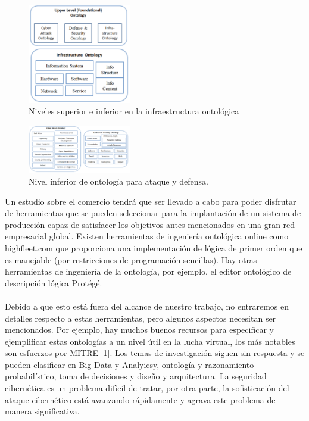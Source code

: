 \documentclass[journal]{IEEEtran}
\begin{document}
\begin{figure}[htb]
\centering
\includegraphics[width=0.4\textwidth]{img3.png}
\caption{Niveles superior e inferior en la infraestructura ontológica}%
\end{figure}

\begin{figure}[htb]
\centering
\includegraphics[width=0.4\textwidth]{img4.png}
\caption{Nivel inferior de ontología para ataque y defensa.}%
\end{figure}

Un estudio sobre el comercio tendrá que ser llevado a cabo para poder disfrutar de herramientas que se pueden seleccionar para la implantación de un sistema de producción capaz de satisfacer los objetivos antes mencionados en una gran red empresarial global. Existen herramientas de ingeniería ontológica online como highfleet.com que proporciona una implementación de lógica de primer orden que es manejable (por restricciones de programación sencillas). Hay otras herramientas de ingeniería de la ontología, por ejemplo, el editor ontológico de descripción lógica Protégé.\\ \\
Debido a que esto está fuera del alcance de nuestro trabajo, no entraremos en detalles respecto a estas herramientas, pero algunos aspectos necesitan ser mencionados. Por ejemplo, hay muchos buenos recursos para especificar y ejemplificar estas ontologías a un nivel útil en la lucha virtual, los más notables son esfuerzos por MITRE [1]. Los temas de investigación siguen sin respuesta y se pueden clasificar en Big Data y Analyicsy, ontología y razonamiento probabilístico, toma de decisiones y diseño y arquitectura. La seguridad cibernética es un problema difícil de tratar, por otra parte, la sofisticación del ataque cibernético está avanzando rápidamente y agrava este problema de manera significativa.
\end{document}
